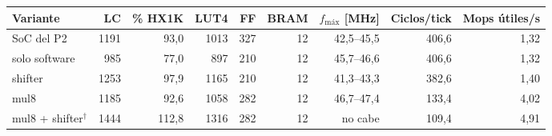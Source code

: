\begin{tabular}{lrrrrrrrr}
\toprule
Variante & LC & \% HX1K & LUT4 & FF & BRAM & $f_\text{máx}$ [MHz] & Ciclos/tick & Mops útiles/s \\
\midrule
SoC del P2 & 1191 & 93,0 & 1013 & 327 & 12 & 42,5--45,5 & 406,6 & 1,32 \\
solo software & 985 & 77,0 & 897 & 210 & 12 & 45,7--46,6 & 406,6 & 1,32 \\
shifter & 1253 & 97,9 & 1165 & 210 & 12 & 41,3--43,3 & 382,6 & 1,40 \\
mul8 & 1185 & 92,6 & 1058 & 282 & 12 & 46,7--47,4 & 133,4 & 4,02 \\
mul8 + shifter$^\dagger$ & 1444 & 112,8 & 1316 & 282 & 12 & no cabe & 109,4 & 4,91 \\
\bottomrule
\end{tabular}
